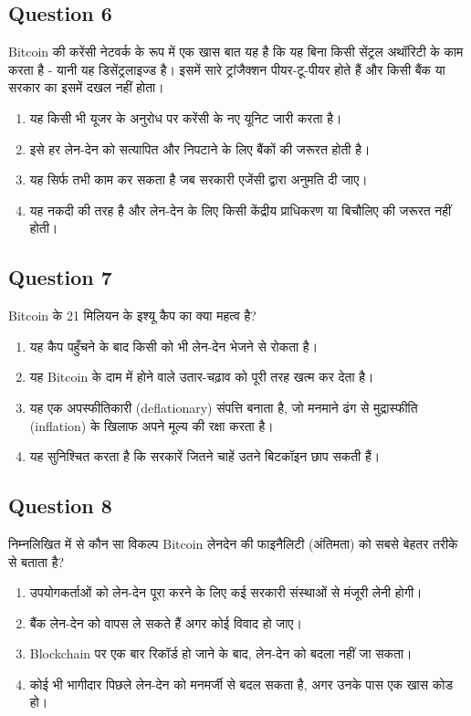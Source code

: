 \documentclass[12pt,a4paper]{article}
\begin{document}
\bigskip


\subsection*{Question 6}
Bitcoin की करेंसी नेटवर्क के रूप में एक खास बात यह है कि यह बिना किसी सेंट्रल अथॉरिटी के काम करता है - यानी यह डिसेंट्रलाइज्ड है। इसमें सारे ट्रांजैक्शन पीयर-टू-पीयर होते हैं और किसी बैंक या सरकार का इसमें दखल नहीं होता।

\begin{enumerate}[label=\Alph*., leftmargin=*]
\item यह किसी भी यूजर के अनुरोध पर करेंसी के नए यूनिट जारी करता है।
\item इसे हर लेन-देन को सत्यापित और निपटाने के लिए बैंकों की जरूरत होती है।
\item यह सिर्फ तभी काम कर सकता है जब सरकारी एजेंसी द्वारा अनुमति दी जाए।
\item यह नकदी की तरह है और लेन-देन के लिए किसी केंद्रीय प्राधिकरण या बिचौलिए की जरूरत नहीं होती।
\end{enumerate}

\bigskip


\subsection*{Question 7}
Bitcoin के 21 मिलियन के इश्यू कैप का क्या महत्व है?

\begin{enumerate}[label=\Alph*., leftmargin=*]
\item यह कैप पहुँचने के बाद किसी को भी लेन-देन भेजने से रोकता है।
\item यह Bitcoin के दाम में होने वाले उतार-चढ़ाव को पूरी तरह खत्म कर देता है।
\item यह एक अपस्फीतिकारी (deflationary) संपत्ति बनाता है, जो मनमाने ढंग से मुद्रास्फीति (inflation) के खिलाफ अपने मूल्य की रक्षा करता है।
\item यह सुनिश्चित करता है कि सरकारें जितने चाहें उतने बिटकॉइन छाप सकती हैं।
\end{enumerate}

\bigskip


\subsection*{Question 8}
निम्नलिखित में से कौन सा विकल्प Bitcoin लेनदेन की फाइनैलिटी (अंतिमता) को सबसे बेहतर तरीके से बताता है?

\begin{enumerate}[label=\Alph*., leftmargin=*]
\item उपयोगकर्ताओं को लेन-देन पूरा करने के लिए कई सरकारी संस्थाओं से मंजूरी लेनी होगी।
\item बैंक लेन-देन को वापस ले सकते हैं अगर कोई विवाद हो जाए।
\item Blockchain पर एक बार रिकॉर्ड हो जाने के बाद, लेन-देन को बदला नहीं जा सकता।
\item कोई भी भागीदार पिछले लेन-देन को मनमर्जी से बदल सकता है, अगर उनके पास एक खास कोड हो।
\end{enumerate}
\end{document}
